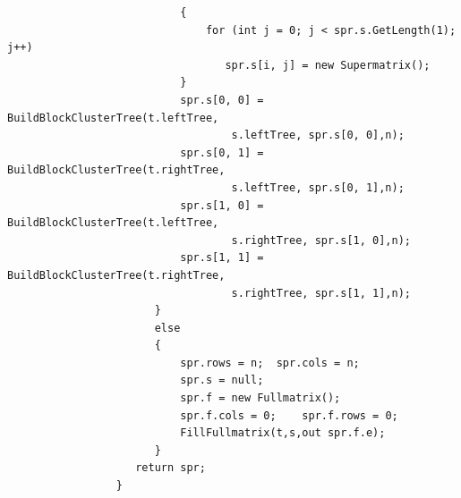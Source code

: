 \documentclass[12pt]{report}
\begin{document}
\begin{enumerate}
\begin{verbatim}
		                   {
		                       for (int j = 0; j < spr.s.GetLength(1); j++)
		                          spr.s[i, j] = new Supermatrix();
		                   }
		                   spr.s[0, 0] = BuildBlockClusterTree(t.leftTree,
		                           s.leftTree, spr.s[0, 0],n);
		                   spr.s[0, 1] = BuildBlockClusterTree(t.rightTree,
		                           s.leftTree, spr.s[0, 1],n);
		                   spr.s[1, 0] = BuildBlockClusterTree(t.leftTree,
		                           s.rightTree, spr.s[1, 0],n);
		                   spr.s[1, 1] = BuildBlockClusterTree(t.rightTree,
		                           s.rightTree, spr.s[1, 1],n);
		               }
		               else
		               {
		               	   spr.rows = n;  spr.cols = n;
		                   spr.s = null;
		                   spr.f = new Fullmatrix();
		                   spr.f.cols = 0;	  spr.f.rows = 0;
		                   FillFullmatrix(t,s,out spr.f.e);
		               }
		            return spr;
		         }
		                

\end{verbatim}
\end{enumerate}
\end{document}
